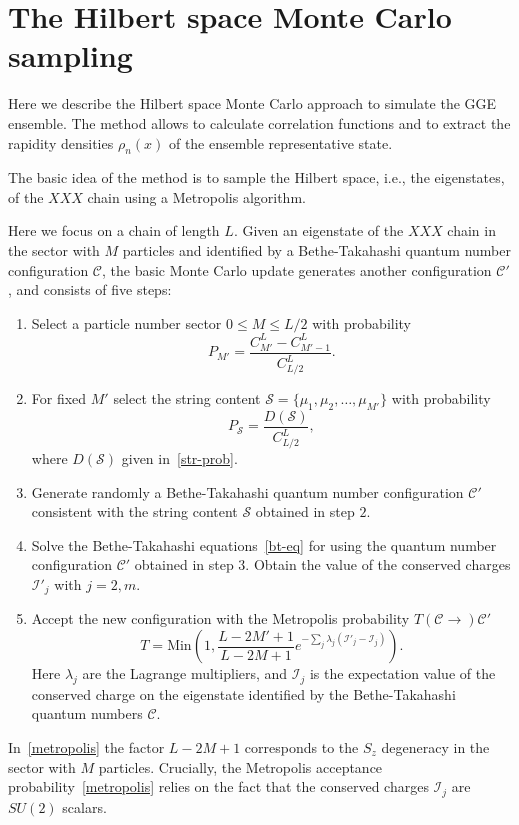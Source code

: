 \documentclass[twocolumn,superscriptaddress,prb,10pt]{revtex4-1}
\begin{document}
\section{The Hilbert space Monte Carlo sampling}

Here we describe the Hilbert space Monte Carlo approach to simulate the GGE 
ensemble. The method allows to calculate correlation functions and to extract 
the rapidity densities $\rho_n(x)$ of the ensemble representative state. 

The basic idea of the method is to sample the Hilbert space, i.e., the eigenstates,
 of the $XXX$ chain using a Metropolis algorithm. 

Here we focus on a chain of length $L$. Given an eigenstate of the $XXX$ chain 
in the sector with $M$ particles and identified by a Bethe-Takahashi quantum number 
configuration ${\mathcal C}$, the basic Monte Carlo update generates another 
configuration ${\mathcal C}'$, and consists of five steps:
%
\begin{enumerate}
%
\item Select a particle number sector $0\le M\le L/2$ with probability 
%
\begin{equation}
P_{M'}=\frac{C^{L}_{M'}-C^L_{M'-1}}{C^{L}_{L/2}}.
\end{equation}
%
\item For fixed $M'$ select the string content ${\mathcal S}=\{\mu_1,\mu_2,\dots,
\mu_{M'}\}$ with probability
%
\begin{equation}
P_{\mathcal S}=\frac{D({\mathcal S})}{C^L_{L/2}},
\end{equation}
%
where $D({\mathcal S})$ given in~\eqref{str-prob}.
\item Generate randomly a Bethe-Takahashi quantum number configuration ${\mathcal C'}$ 
consistent with the string content ${\mathcal S}$ obtained in step $2$.
\item Solve the Bethe-Takahashi equations~\eqref{bt-eq} for using the quantum number 
configuration ${\mathcal C}'$ obtained in step $3$. Obtain the value of the conserved 
charges ${\mathcal I}'_j$ with $j=2,m$.
\item Accept the new configuration with the Metropolis probability $T({\mathcal C}
\rightarrow){\mathcal C}'$ 
%
\begin{equation}
\label{metropolis}
T=
\textrm{Min}\left(1,\frac{L-2M'+1}{L-2M+1}e^{-\sum_j\lambda_j({\mathcal I}'_j-{\mathcal 
I}^{}_j)}\right).
\end{equation}
Here $\lambda_j$ are the Lagrange multipliers, and ${\mathcal I}_j$ is the expectation 
value of the conserved charge on the eigenstate identified by the Bethe-Takahashi quantum 
numbers ${\mathcal C}$. 
\end{enumerate}
%
In~\eqref{metropolis} the factor $L-2M+1$ corresponds to the $S_z$ degeneracy in the 
sector with $M$ particles. Crucially, the Metropolis acceptance probability~\eqref{metropolis} 
relies on the fact that the conserved charges ${\mathcal I}_j$ are $SU(2)$ scalars. 
\end{document}
